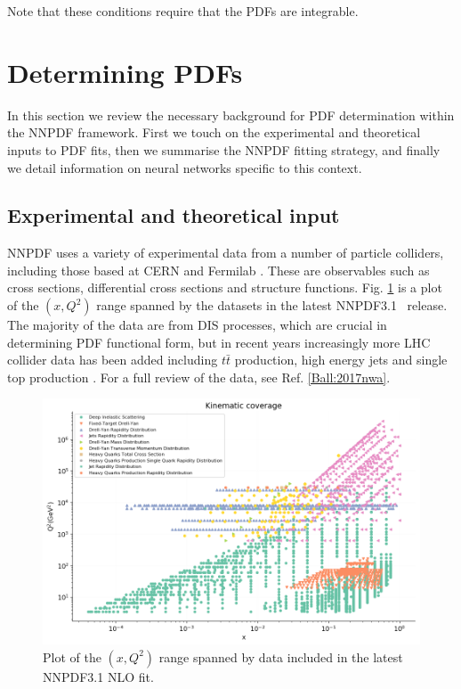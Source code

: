 Note that these conditions require that the PDFs are integrable. 


\section{Determining PDFs}

In this section we review the necessary background for PDF determination within the NNPDF \cite{nnpdf} framework. First we touch on the experimental and theoretical inputs to PDF fits, then we summarise the NNPDF fitting strategy, and finally we detail information on neural networks specific to this context.

\subsection{Experimental and theoretical input}


NNPDF uses a variety of experimental data from a number of particle colliders, including those based at CERN \cite{cern} and Fermilab \cite{fermilab}. These are observables such as cross sections, differential cross sections and structure functions. Fig. \ref{data} is a plot of the $(x,Q^2)$ range spanned by the datasets in the latest NNPDF3.1~\cite{Ball:2017nwa} release. The majority of the data are from DIS processes, which are crucial in determining PDF functional form, but in recent years increasingly more LHC collider data has been added including $t\bar{t}$ production, high energy jets and single top production \cite{Nocera:2019wyk}. For a full review of the data, see Ref. \ref{Ball:2017nwa}.

\begin{figure}
\centering
\includegraphics[width=15cm]{background/NNPDF31_nlo_as_0118_1000_markers0_fitcontext_plot_xq2.png}
\caption{Plot of the $(x,Q^2)$ range spanned by data included in the latest NNPDF3.1 NLO fit.}
\label{data}
\end{figure}

